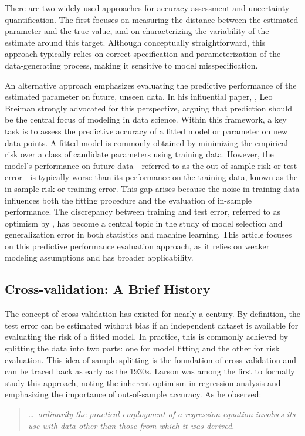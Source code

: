 \documentclass[11pt]{article}
\theoremstyle{plain}
\begin{document}
There are two widely used approaches for accuracy assessment and uncertainty
quantification. The first focuses on measuring the distance between the estimated parameter
and the true value, and on characterizing the variability of the estimate around this target.
Although conceptually straightforward, this approach typically relies on correct specification
and parameterization of the data-generating process, making it sensitive to model
misspecification.

An alternative approach emphasizes evaluating the predictive performance of the estimated parameter on future, unseen data. In his influential paper, \cite{breiman2001statistical}, Leo Breiman strongly advocated for this perspective, arguing that prediction should be the central focus of modeling in data science. Within this framework, a key task is to assess the predictive accuracy of a fitted model or parameter on new data points. A fitted model is commonly obtained by minimizing the empirical risk over a class of candidate parameters using training data. However, the model’s performance on future data---referred to as the out-of-sample risk or test error---is typically worse than its performance on the training data, known as the in-sample risk or training error. This gap arises because the noise in training data influences both the fitting procedure and the evaluation of in-sample performance. The discrepancy between training and test error, referred to as optimism by \cite{efron1986biased}, has become a central topic in the study of model selection and generalization error in both statistics and machine learning. This article focuses on this predictive performance evaluation approach, as it relies on weaker modeling assumptions and has broader applicability.

\subsection{Cross-validation: A Brief History}
The concept of cross-validation has existed for nearly a century. By definition, the test error can be estimated without bias if an independent dataset is available for evaluating the risk of a fitted model. In practice, this is commonly achieved by splitting the data into two parts: one for model fitting and the other for risk evaluation. This idea of sample splitting is the foundation of cross-validation and can be traced back as early as the 1930s. Larson \citep{larson1931shrinkage} was among the first to formally study this approach, noting the inherent optimism in regression analysis and emphasizing the importance of out-of-sample accuracy. As he observed:
\begin{quote}
   \emph{\ldots\ ordinarily the practical employment of a regression equation involves its use with data other than those from which it was derived.}
\end{quote}
\end{document}
